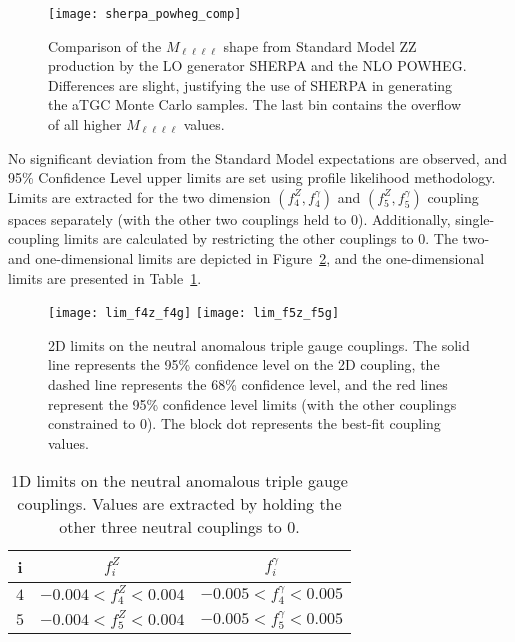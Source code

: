 \begin{figure}[h]
\centering
\texttt{[image: sherpa\_powheg\_comp]}
\caption[Comparison of the $M_{\ell\ell\ell\ell}$ for Standard Model ZZ production
by the LO generator SHERPA and the NLO POWHEG.]{Comparison of the
    $M_{\ell\ell\ell\ell}$ shape from Standard Model ZZ production by the LO generator
    SHERPA and the NLO POWHEG. Differences are slight, justifying the use of
SHERPA in generating the aTGC Monte Carlo samples. The last bin contains the
overflow of all higher $M_{\ell\ell\ell\ell}$ values.} 
\label{fig:sherpaPowhegComp}
\end{figure}

No significant deviation from the Standard Model expectations are observed, and
95\% Confidence Level upper limits are set using profile likelihood methodology.
Limits are extracted for the two dimension $(f_4^Z, f_4^{\gamma})$ and $(f_5^Z,
f_5^{\gamma})$ coupling spaces separately (with the other two couplings held to
0). Additionally, single-coupling limits are calculated by restricting the other
couplings to 0. The two- and one-dimensional limits are depicted in
Figure~\ref{fig:atgc_limits}, and the one-dimensional limits are presented in
Table~\ref{tab:atgc_limits}.

\begin{figure}[h]
\centering
\texttt{[image: lim\_f4z\_f4g]}
\texttt{[image: lim\_f5z\_f5g]}
\caption[2D limits on the neutral anomalous triple gauge couplings.]{2D limits
on the neutral anomalous triple gauge couplings. The solid line represents the 95\%
confidence level on the 2D coupling, the dashed line represents the 68\%
confidence level, and the red lines represent the 95\% confidence level
limits (with the other couplings constrained to 0). The block dot represents the
best-fit coupling values.}
\label{fig:atgc_limits}
\end{figure}

\begin{table}[h]
\centering
\begin{tabular}{|c|c|c|}
    \hline
i  & $f_{i}^Z $& $f_{i}^{\gamma} $ \\
\hline
$4$ & $-0.004 < f_4^Z < 0.004 $&$ -0.005 < f_4^{\gamma} < 0.005 $\\
$5$ & $-0.004 < f_5^Z < 0.004 $&$ -0.005 < f_5^{\gamma} < 0.005 $\\
\hline
\end{tabular}
\caption[1D limits on the neutral anomalous triple gauge couplings.]{1D limits
on the neutral anomalous triple gauge couplings. Values are extracted by holding
the other three neutral couplings to 0.}
\label{tab:atgc_limits}
\end{table}
\clearpage

